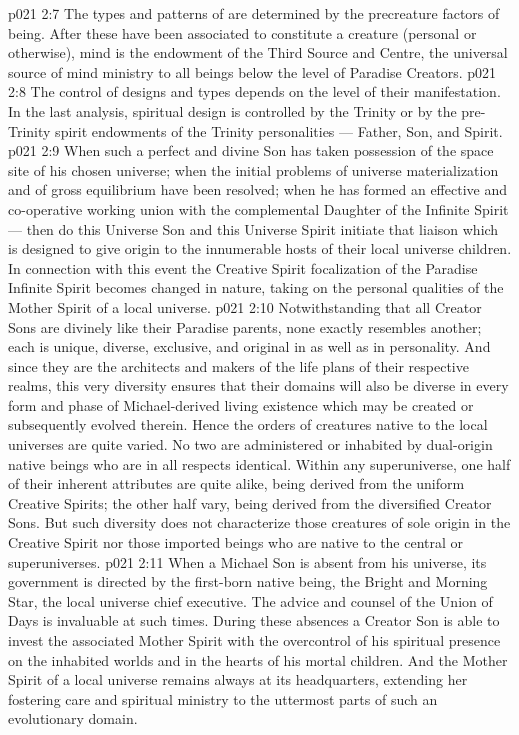 \vs p021 2:7 \pc The types and patterns of  are determined by the precreature factors of being. After these have been associated to constitute a creature (personal or otherwise), mind is the endowment of the Third Source and Centre, the universal source of mind ministry to all beings below the level of Paradise Creators.
\vs p021 2:8 \pc The control of  designs and types depends on the level of their manifestation. In the last analysis, spiritual design is controlled by the Trinity or by the pre\hyp{}Trinity spirit endowments of the Trinity personalities --- Father, Son, and Spirit.
\vs p021 2:9 \pc When such a perfect and divine Son has taken possession of the space site of his chosen universe; when the initial problems of universe materialization and of gross equilibrium have been resolved; when he has formed an effective and co\hyp{}operative working union with the complemental Daughter of the Infinite Spirit --- then do this Universe Son and this Universe Spirit initiate that liaison which is designed to give origin to the innumerable hosts of their local universe children. In connection with this event the Creative Spirit focalization of the Paradise Infinite Spirit becomes changed in nature, taking on the personal qualities of the Mother Spirit of a local universe.
\vs p021 2:10 Notwithstanding that all Creator Sons are divinely like their Paradise parents, none exactly resembles another; each is unique, diverse, exclusive, and original in  as well as in personality. And since they are the architects and makers of the life plans of their respective realms, this very diversity ensures that their domains will also be diverse in every form and phase of Michael\hyp{}derived living existence which may be created or subsequently evolved therein. Hence the orders of creatures native to the local universes are quite varied. No two are administered or inhabited by dual\hyp{}origin native beings who are in all respects identical. Within any superuniverse, one half of their inherent attributes are quite alike, being derived from the uniform Creative Spirits; the other half vary, being derived from the diversified Creator Sons. But such diversity does not characterize those creatures of sole origin in the Creative Spirit nor those imported beings who are native to the central or superuniverses.
\vs p021 2:11 \pc When a Michael Son is absent from his universe, its government is directed by the first\hyp{}born native being, the Bright and Morning Star, the local universe chief executive. The advice and counsel of the Union of Days is invaluable at such times. During these absences a Creator Son is able to invest the associated Mother Spirit with the overcontrol of his spiritual presence on the inhabited worlds and in the hearts of his mortal children. And the Mother Spirit of a local universe remains always at its headquarters, extending her fostering care and spiritual ministry to the uttermost parts of such an evolutionary domain.
